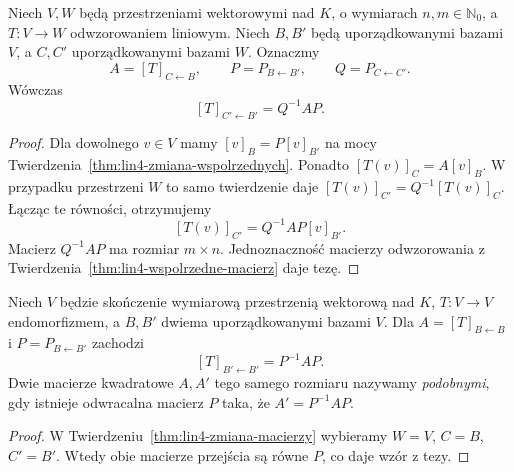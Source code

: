 \begin{twierdzenie}
\label{thm:lin4-zmiana-macierzy}
Niech \(V,W\) będą przestrzeniami wektorowymi
nad \(K\), o wymiarach \(n,m\in\mathbb N_0\),
a \(T\colon V\to W\) odwzorowaniem liniowym.
Niech \(B,B'\) będą uporządkowanymi bazami \(V\),
a \(C,C'\) uporządkowanymi bazami \(W\).
Oznaczmy
\[
 A=[T]_{C\leftarrow B},\qquad
 P=P_{B\leftarrow B'},\qquad
 Q=P_{C\leftarrow C'}.
\]
Wówczas
\[
 [T]_{C'\leftarrow B'}=Q^{-1}AP.
\]
\end{twierdzenie}
\begin{proof}
Dla dowolnego \(v\in V\) mamy
\([v]_B=P[v]_{B'}\) na mocy
Twierdzenia~\ref{thm:lin4-zmiana-wspolrzednych}.
Ponadto
\([T(v)]_C=A[v]_B\).
W przypadku przestrzeni \(W\)
to samo twierdzenie daje
\([T(v)]_{C'}=Q^{-1}[T(v)]_C\).
Łącząc te równości, otrzymujemy
\[
 [T(v)]_{C'}=Q^{-1}AP[v]_{B'}.
\]
Macierz \(Q^{-1}AP\) ma rozmiar \(m\times n\).
Jednoznaczność macierzy odwzorowania
z Twierdzenia~\ref{thm:lin4-wspolrzedne-macierz}
daje tezę.
\end{proof}

\begin{wniosek}
\label{cor:lin4-podobienstwo}
Niech \(V\) będzie skończenie wymiarową
przestrzenią wektorową nad \(K\),
\(T\colon V\to V\) endomorfizmem,
a \(B,B'\) dwiema uporządkowanymi bazami \(V\).
Dla \(A=[T]_{B\leftarrow B}\) i
\(P=P_{B\leftarrow B'}\) zachodzi
\[
 [T]_{B'\leftarrow B'}=P^{-1}AP.
\]
Dwie macierze kwadratowe \(A,A'\)
tego samego rozmiaru nazywamy
\emph{podobnymi}, gdy istnieje
odwracalna macierz \(P\) taka, że
\(A'=P^{-1}AP\).
\end{wniosek}
\begin{proof}
W Twierdzeniu~\ref{thm:lin4-zmiana-macierzy}
wybieramy \(W=V\), \(C=B\), \(C'=B'\).
Wtedy obie macierze przejścia są równe \(P\),
co daje wzór z tezy.
\end{proof}

